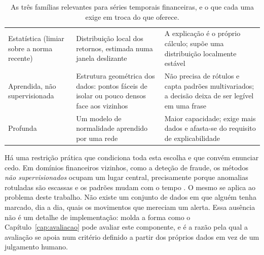 \begin{table}[ht]
\caption[Famílias de deteção de anomalias]{As três famílias relevantes para séries temporais
financeiras, e o que cada uma exige em troca do que oferece.}
\label{tab:ctx_anomalias}
\centering
\small
\begin{tabular}{L{0.20\textwidth} L{0.30\textwidth} L{0.36\textwidth}}
\toprule
{} &  &  \\
\midrule
Estatística \newline (limiar sobre a norma recente)
  & Distribuição local dos retornos, estimada numa janela deslizante
  & A explicação é o próprio cálculo; supõe uma distribuição localmente estável \\
\addlinespace
Aprendida, não supervisionada \newline \autocite{liu2008isolation, breunig2000lof}
  & Estrutura geométrica dos dados: pontos fáceis de isolar ou pouco densos face aos vizinhos
  & Não precisa de rótulos e capta padrões multivariados; a decisão deixa de ser legível em uma frase \\
\addlinespace
Profunda \newline \autocite{pang2021deep}
  & Um modelo de normalidade aprendido por uma rede
  & Maior capacidade; exige mais dados e afasta-se do requisito de explicabilidade \\
\bottomrule
\end{tabular}
\end{table}

Há uma restrição prática que condiciona toda esta escolha e que convém enunciar cedo. Em domínios
financeiros vizinhos, como a deteção de fraude, os métodos \emph{não supervisionados} ocupam um lugar
central, precisamente porque anomalias rotuladas são escassas e os padrões mudam com o tempo
\autocite{ahmed2016financial}. O mesmo se aplica ao problema deste trabalho. Não existe um conjunto de dados em que alguém tenha marcado, dia a
dia, quais os movimentos que mereciam um alerta. Essa ausência não é um detalhe de implementação:
molda a forma como o Capítulo~\ref{cap:avaliacao} pode avaliar este componente, e é a razão pela
qual a avaliação se apoia num critério definido a partir dos próprios dados em vez de um julgamento
humano.

